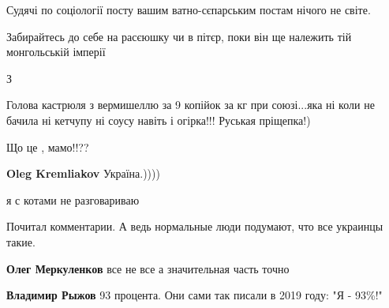 \begin{itemize}


Судячі по соціології посту вашим ватно-сєпарським постам нічого не світе.

Забирайтесь до себе на расєюшку чи в пітєр, поки він ще належить тій
монгольській імперії


З


Голова кастрюля з вермишеллю за 9 копійок за кг при союзі...яка ні коли не бачила ні кетчупу ні соусу навіть і огірка!!! Руськая пріщепка!)


Що це , мамо!!??

\begin{itemize}

\textbf{Oleg Kremliakov} Україна.))))


я с котами не разговариваю
\end{itemize}


Почитал комментарии. А ведь нормальные люди подумают, что все украинцы такие.

\begin{itemize}

\textbf{Олег Меркуленков} все не все а значительная часть точно


\textbf{Владимир Рыжов} 93 процента. Они сами так писали в 2019 году: "Я - 93\%!" \Smiley[1.0][yellow]


\end{itemize}
\end{itemize}
